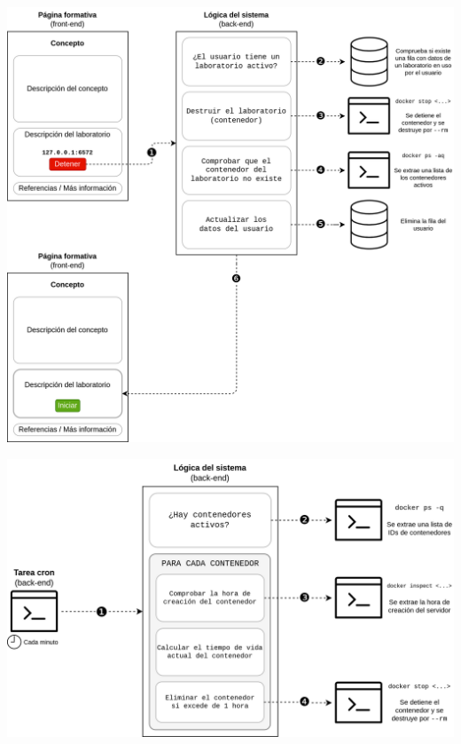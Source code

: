     \begin{frame}
        \centering

        \includegraphics[scale=0.09]{images/diagramas/detener.png}
    \end{frame}

    \begin{frame}
        \centering

        \includegraphics[scale=0.15]{images/diagramas/cron.png}
    \end{frame}

